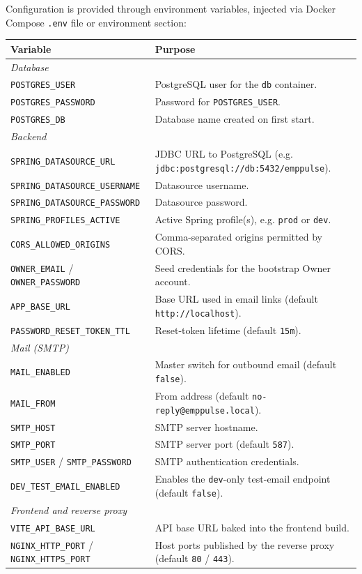\documentclass[11pt,a4paper]{article}
\begin{document}
Configuration is provided through environment variables, injected via Docker Compose \texttt{.env} file or environment section:

\begin{longtable}{p{5.8cm} p{7.7cm}}
\toprule
\textbf{Variable} & \textbf{Purpose} \\
\midrule
\endhead
\multicolumn{2}{l}{\textit{Database}} \\
\midrule
\texttt{POSTGRES\_USER} & PostgreSQL user for the \texttt{db} container. \\
\texttt{POSTGRES\_PASSWORD} & Password for \texttt{POSTGRES\_USER}. \\
\texttt{POSTGRES\_DB} & Database name created on first start. \\
\midrule
\multicolumn{2}{l}{\textit{Backend}} \\
\midrule
\texttt{SPRING\_DATASOURCE\_URL} & JDBC URL to PostgreSQL (e.g. \texttt{jdbc:postgresql://db:5432/emppulse}). \\
\texttt{SPRING\_DATASOURCE\_USERNAME} & Datasource username. \\
\texttt{SPRING\_DATASOURCE\_PASSWORD} & Datasource password. \\
\texttt{SPRING\_PROFILES\_ACTIVE} & Active Spring profile(s), e.g. \texttt{prod} or \texttt{dev}. \\
\texttt{CORS\_ALLOWED\_ORIGINS} & Comma-separated origins permitted by CORS. \\
\texttt{OWNER\_EMAIL} / \texttt{OWNER\_PASSWORD} & Seed credentials for the bootstrap Owner account. \\
\texttt{APP\_BASE\_URL} & Base URL used in email links (default \texttt{http://localhost}). \\
\texttt{PASSWORD\_RESET\_TOKEN\_TTL} & Reset-token lifetime (default \texttt{15m}). \\
\midrule
\multicolumn{2}{l}{\textit{Mail (SMTP)}} \\
\midrule
\texttt{MAIL\_ENABLED} & Master switch for outbound email (default \texttt{false}). \\
\texttt{MAIL\_FROM} & From address (default \texttt{no-reply@emppulse.local}). \\
\texttt{SMTP\_HOST} & SMTP server hostname. \\
\texttt{SMTP\_PORT} & SMTP server port (default \texttt{587}). \\
\texttt{SMTP\_USER} / \texttt{SMTP\_PASSWORD} & SMTP authentication credentials. \\
\texttt{DEV\_TEST\_EMAIL\_ENABLED} & Enables the \texttt{dev}-only test-email endpoint (default \texttt{false}). \\
\midrule
\multicolumn{2}{l}{\textit{Frontend and reverse proxy}} \\
\midrule
\texttt{VITE\_API\_BASE\_URL} & API base URL baked into the frontend build. \\
\texttt{NGINX\_HTTP\_PORT} / \texttt{NGINX\_HTTPS\_PORT} & Host ports published by the reverse proxy (default \texttt{80} / \texttt{443}). \\
\bottomrule
\end{longtable}
\end{document}
